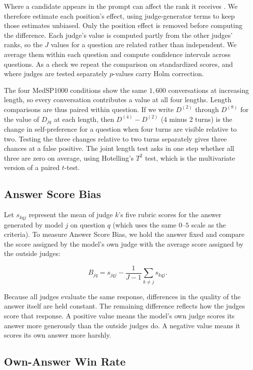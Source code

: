 \documentclass[11pt]{article}
\begin{document}
Where a candidate appears in the prompt can affect the rank it receives \citep{zheng2023judging}. We therefore estimate each position's effect, using judge-generator terms to keep those estimates unbiased. Only the position effect is removed before computing the difference. Each judge's value is computed partly from the other judges' ranks, so the $J$ values for a question are related rather than independent. We average them within each question and compute confidence intervals across questions. As a check we repeat the comparison on standardized scores, and where judges are tested separately $p$-values carry Holm correction.


The four MedSP1000 conditions show the same $1{,}600$ conversations at increasing length, so every conversation contributes a value at all four lengths. Length comparisons are thus paired within question. If we write $D^{(2)}$ through $D^{(8)}$ for the value of $D_{jq}$ at each length, then $D^{(4)}-D^{(2)}$ (4 minus 2 turns) is the change in self-preference for a question when four turns are visible relative to two. Testing the three changes relative to two turns separately gives three chances at a false positive. The joint length test asks in one step whether all three are zero on average, using Hotelling's $T^{2}$ test, which is the multivariate version of a paired $t$-test.


\subsection{Answer Score Bias}
Let $s_{kqj}$ represent the mean of judge $k$’s five rubric scores for the answer generated by model $j$ on question $q$ (which uses the same $0$--$5$ scale as the criteria). To measure Answer Score Bias, we hold the answer fixed and compare the score assigned by the model’s own judge with the average score assigned by the outside judges:

\begin{equation}
B_{jq}=s_{jqj}-\frac{1}{J-1}\sum_{k\ne j}s_{kqj}.
\end{equation}

Because all judges evaluate the same response, differences in the quality of the answer itself are held constant. The remaining difference reflects how the judges score that response. A positive value means the model’s own judge scores its answer more generously than the outside judges do. A negative value means it scores its own answer more harshly.

\subsection{Own-Answer Win Rate}
\end{document}
